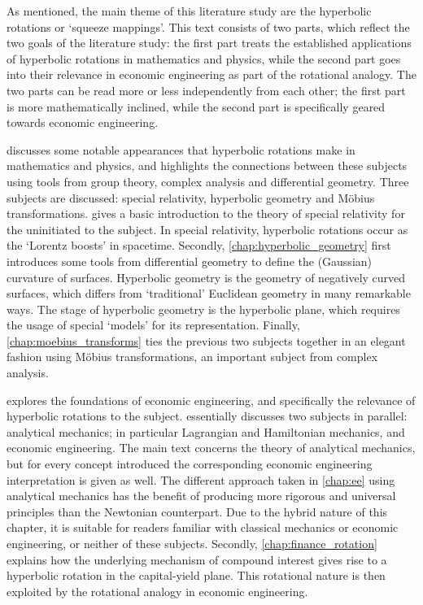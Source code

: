 As mentioned, the main theme of this literature study are the hyperbolic rotations or `squeeze mappings'. This text consists of two parts, which reflect the two goals of the literature study: the first part treats the established applications of hyperbolic rotations in mathematics and physics, while the second part goes into their relevance in economic engineering as part of the rotational analogy. 
The two parts can be read more or less independently from each other; the first part is more mathematically inclined, while the second part is specifically geared towards economic engineering.
\begin{description}
    \item{\textbf{}} discusses some notable appearances that hyperbolic rotations make in mathematics and physics, and highlights the connections between these subjects using tools from group theory, complex analysis and differential geometry. Three subjects are discussed: special relativity, hyperbolic geometry and Möbius transformations.  gives a basic introduction to the theory of special relativity for the uninitiated to the subject. In special relativity, hyperbolic rotations occur as the `Lorentz boosts' in spacetime. Secondly, \cref{chap:hyperbolic_geometry} first introduces some tools from differential geometry to define the (Gaussian) curvature of surfaces. Hyperbolic geometry is the geometry of negatively curved surfaces, which differs from `traditional' Euclidean geometry in many remarkable ways. The stage of hyperbolic geometry is the hyperbolic plane, which requires the usage of special `models' for its representation. Finally, \cref{chap:moebius_transforms} ties the previous two subjects together in an elegant fashion using Möbius transformations, an important subject from complex analysis.
    
    \item{\textbf{}} explores the foundations of economic engineering, and specifically the relevance of hyperbolic rotations to the subject.  essentially discusses two subjects in parallel: analytical mechanics; in particular Lagrangian and Hamiltonian mechanics, and economic engineering. The main text concerns the theory of analytical mechanics, but for every concept introduced the corresponding economic engineering interpretation is given as well. The different approach taken in \cref{chap:ee} using analytical mechanics has the benefit of producing more rigorous and universal principles than the Newtonian counterpart. Due to the hybrid nature of this chapter, it is suitable for readers familiar with classical mechanics or economic engineering, or neither of these subjects. Secondly, \cref{chap:finance_rotation} explains how the underlying mechanism of compound interest gives rise to a hyperbolic rotation in the capital-yield plane. This rotational nature is then exploited by the rotational analogy in economic engineering.
\end{description}

